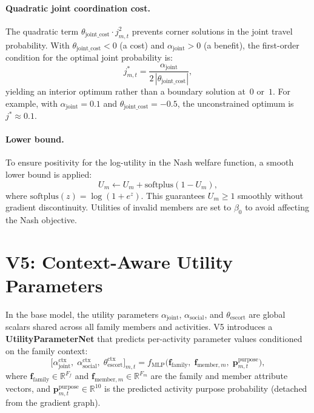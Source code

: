 \documentclass[11pt,a4paper]{article}
\newcommand{\R}{\mathbb{R}}
\newcommand{\softplus}{\mathrm{softplus}}
\begin{document}
\paragraph{Quadratic joint coordination cost.}
The quadratic term $\theta_{\mathrm{joint\_cost}} \cdot j_{m,t}^2$ prevents corner solutions in the joint travel probability.
With $\theta_{\mathrm{joint\_cost}} < 0$ (a cost) and $\alpha_{\mathrm{joint}} > 0$ (a benefit), the first-order condition for the optimal joint probability is:
\begin{equation}
    j^*_{m,t} = \frac{\alpha_{\mathrm{joint}}}{2\,|\theta_{\mathrm{joint\_cost}}|},
    \label{eq:joint_interior}
\end{equation}
yielding an interior optimum rather than a boundary solution at~$0$ or~$1$.
For example, with $\alpha_{\mathrm{joint}} = 0.1$ and $\theta_{\mathrm{joint\_cost}} = -0.5$, the unconstrained optimum is $j^* \approx 0.1$.

\paragraph{Lower bound.}
To ensure positivity for the log-utility in the Nash welfare function, a smooth lower bound is applied:
\begin{equation}
    U_m \leftarrow U_m + \softplus(1 - U_m),
    \label{eq:utility_lb}
\end{equation}
where $\softplus(z) = \log(1 + e^z)$.
This guarantees $U_m \geq 1$ smoothly without gradient discontinuity.
Utilities of invalid members are set to $\beta_0$ to avoid affecting the Nash objective.


\section{V5: Context-Aware Utility Parameters}
\label{sec:ctx_params}

In the base model, the utility parameters $\alpha_{\mathrm{joint}}$, $\alpha_{\mathrm{social}}$, and $\theta_{\mathrm{escort}}$ are global scalars shared across all family members and activities.
V5 introduces a \textbf{UtilityParameterNet} that predicts per-activity parameter values conditioned on the family context:
\begin{equation}
    \bigl[\alpha_{\mathrm{joint}}^{\mathrm{ctx}},\; \alpha_{\mathrm{social}}^{\mathrm{ctx}},\; \theta_{\mathrm{escort}}^{\mathrm{ctx}}\bigr]_{m,t}
    = f_{\mathrm{MLP}}\!\bigl(\mathbf{f}_{\mathrm{family}},\; \mathbf{f}_{\mathrm{member},m},\; \mathbf{p}^{\mathrm{purpose}}_{m,t}\bigr),
    \label{eq:ctx_params}
\end{equation}
where $\mathbf{f}_{\mathrm{family}} \in \R^{F_f}$ and $\mathbf{f}_{\mathrm{member},m} \in \R^{F_m}$ are the family and member attribute vectors, and $\mathbf{p}^{\mathrm{purpose}}_{m,t} \in \R^{10}$ is the predicted activity purpose probability (detached from the gradient graph).
\end{document}

